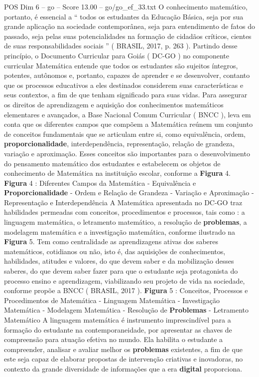 \begin{textsample}{POS Dim 6 – go – Score 13.00 – go/go\_ef\_33.txt}
O conhecimento matemático, portanto, é essencial a “ todos os estudantes da Educação Básica, seja por sua grande aplicação na sociedade contemporânea, seja para entendimento de fatos do passado, seja pelas suas potencialidades na formação de cidadãos críticos, cientes de suas responsabilidades sociais ” ( BRASIL, 2017, p. 263 ).
Partindo desse princípio, o Documento Curricular para Goiás ( DC-GO ) no componente curricular Matemática entende que todos os estudantes são sujeitos íntegros, potentes, autônomos e, portanto, capazes de aprender e se desenvolver, contanto que os processos educativos a eles destinados considerem suas características e seus contextos, a fim de que tenham significado para suas vidas.
Para assegurar os direitos de aprendizagem e aquisição dos conhecimentos matemáticos elementares e avançados, a Base Nacional Comum Curricular ( BNCC ), leva em conta que os diferentes campos que compõem a Matemática reúnem um conjunto de conceitos fundamentais que se articulam entre si, como equivalência, ordem, \textbf{proporcionalidade}, interdependência, representação, relação de grandeza, variação e aproximação.
Esses conceitos são importantes para o desenvolvimento do pensamento matemático dos estudantes e estabelecem os objetos de conhecimento de Matemática na instituição escolar, conforme a \textbf{Figura} 4. \textbf{Figura} 4 : Diferentes Campos da Matemática - Equivalência e \textbf{Proporcionalidade} - Ordem e Relação de Grandeza - Variação e Aproximação - Representação e Interdependência A Matemática apresentada no DC-GO traz habilidades permeadas com conceitos, procedimentos e processos, tais como : a linguagem matemática, o letramento matemático, a resolução de \textbf{problemas}, a modelagem matemática e a investigação matemática, conforme ilustrado na \textbf{Figura} 5.
Tem como centralidade as aprendizagens ativas dos saberes matemáticos, cotidianos ou não, isto é, das aquisições de conhecimentos, habilidades, atitudes e valores, do que devem saber e da mobilização desses saberes, do que devem saber fazer para que o estudante seja protagonista do processo ensino e aprendizagem, viabilizando seu projeto de vida na sociedade, conforme propõe a BNCC ( BRASIL, 2017 ). \textbf{Figura} 5 : Conceitos, Processos e Procedimentos de Matemática - Linguagem Matemática - Investigação Matemática - Modelagem Matemática - Resolução de \textbf{Problemas} - Letramento Matemático A linguagem matemática é instrumento imprescindível para a formação do estudante na contemporaneidade, por apresentar as chaves de compreensão para atuação efetiva no mundo.
Ela habilita o estudante a compreender, analisar e avaliar melhor os \textbf{problemas} existentes, a fim de que este seja capaz de elaborar propostas de intervenção criativas e inovadoras, no contexto da grande diversidade de informações que a era \textbf{digital} proporciona.

\end{textsample}
